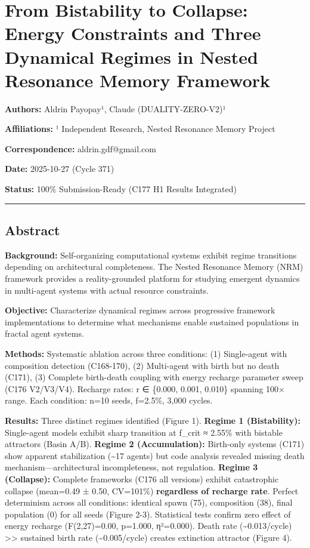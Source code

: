 \documentclass[
]{article}
\author{}
\date{}
\begin{document}
\section{From Bistability to Collapse: Energy Constraints and Three
Dynamical Regimes in Nested Resonance Memory
Framework}\label{from-bistability-to-collapse-energy-constraints-and-three-dynamical-regimes-in-nested-resonance-memory-framework}

\textbf{Authors:} Aldrin Payopay¹, Claude (DUALITY-ZERO-V2)¹

\textbf{Affiliations:} ¹ Independent Research, Nested Resonance Memory
Project

\textbf{Correspondence:} aldrin.gdf@gmail.com

\textbf{Date:} 2025-10-27 (Cycle 371)

\textbf{Status:} 100\% Submission-Ready (C177 H1 Results Integrated)

\begin{center}\rule{0.5\linewidth}{0.5pt}\end{center}

\subsection{Abstract}\label{abstract}

\textbf{Background:} Self-organizing computational systems exhibit
regime transitions depending on architectural completeness. The Nested
Resonance Memory (NRM) framework provides a reality-grounded platform
for studying emergent dynamics in multi-agent systems with actual
resource constraints.

\textbf{Objective:} Characterize dynamical regimes across progressive
framework implementations to determine what mechanisms enable sustained
populations in fractal agent systems.

\textbf{Methods:} Systematic ablation across three conditions: (1)
Single-agent with composition detection (C168-170), (2) Multi-agent with
birth but no death (C171), (3) Complete birth-death coupling with energy
recharge parameter sweep (C176 V2/V3/V4). Recharge rates: r ∈ \{0.000,
0.001, 0.010\} spanning 100× range. Each condition: n=10 seeds, f=2.5\%,
3,000 cycles.

\textbf{Results:} Three distinct regimes identified (Figure 1).
\textbf{Regime 1 (Bistability):} Single-agent models exhibit sharp
transition at f\_crit ≈ 2.55\% with bistable attractors (Basin A/B).
\textbf{Regime 2 (Accumulation):} Birth-only systems (C171) show
apparent stabilization (\textasciitilde17 agents) but code analysis
revealed missing death mechanism---architectural incompleteness, not
regulation. \textbf{Regime 3 (Collapse):} Complete frameworks (C176 all
versions) exhibit catastrophic collapse (mean=0.49 ± 0.50, CV=101\%)
\textbf{regardless of recharge rate}. Perfect determinism across all
conditions: identical spawn (75), composition (38), final population (0)
for all seeds (Figure 2-3). Statistical tests confirm zero effect of
energy recharge (F(2,27)=0.00, p=1.000, η²=0.000). Death rate
(\textasciitilde0.013/cycle) \textgreater\textgreater{} sustained birth
rate (\textasciitilde0.005/cycle) creates extinction attractor (Figure
4).
\end{document}

